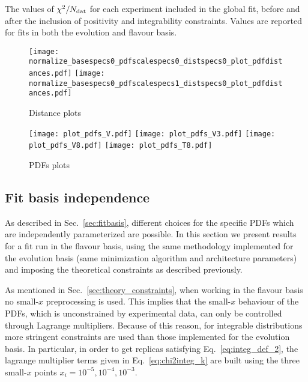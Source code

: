 \begin{table}[htbp!]
    \centering
    
    \caption{The values of $\chi^2/N_{\rm dat}$ for each experiment included in the global fit, before and
    after the inclusion of positivity and integrability constraints. Values are reported for fits in both the evolution and flavour 
    basis.}
    \label{tab:experiments_chi2}
\end{table}

\begin{figure}[t!]
    \begin{center}
        \texttt{[image: normalize\_basespecs0\_pdfscalespecs0\_distspecs0\_plot\_pdfdistances.pdf]}
        \texttt{[image: normalize\_basespecs0\_pdfscalespecs1\_distspecs0\_plot\_pdfdistances.pdf]}
        \caption{Distance plots} 
        \label{fig:distances} 
    \end{center}
\end{figure}

\begin{figure}[t!]
    \begin{center}
        \texttt{[image: plot\_pdfs\_V.pdf]}
        \texttt{[image: plot\_pdfs\_V3.pdf]}
        \texttt{[image: plot\_pdfs\_V8.pdf]}
        \texttt{[image: plot\_pdfs\_T8.pdf]}
        \caption{PDFs plots} 
        \label{fig:pdfs_plots} 
    \end{center}
\end{figure}


\subsection{Fit basis independence}
As described in Sec.~\ref{sec:fitbasis}, different choices for the specific PDFs which are independently
parameterized are possible.
In this section we present results for a fit run in the flavour basis, using the same methodology
implemented for the evolution basis (same minimization algorithm and architecture parameters) 
and imposing the theoretical constraints as described previously.

%
As mentioned in Sec.~\ref{sec:theory_constraints}, when working in the flavour basis 
no small-$x$ preprocessing is used. This implies that the small-$x$ behaviour of the PDFs, which is unconstrained 
by experimental data, can only be controlled through Lagrange multipliers.
Because of this reason, for integrable distributions more stringent constraints are used than those implemented
for the evolution basis. In particular, in order to get replicas satisfying Eq.~\eqref{eq:integ_def_2},
the lagrange multiplier terms given in Eq.~\eqref{eq:chi2integ_k} are built using the three small-$x$
points $x_i = 10^{-5}, 10^{-4}, 10^{-3}$. 

